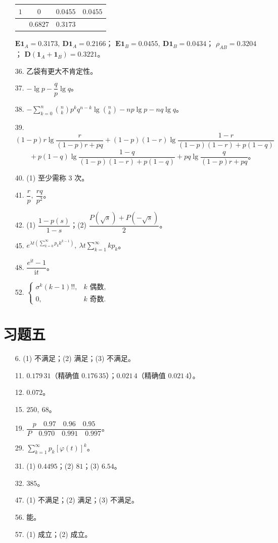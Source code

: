 \documentclass[../main.tex]{subfiles}
\begin{document}
\begin{enumerate}
\begin{center}
\begin{tabular}{c|cc|c}
$1$ & $0$ & $0.0455$ & $0.0455$\\
\hline
& $0.6827$ & $0.3173$ &
\end{tabular}\end{center}
$\boldsymbol{E}\mathbf{1}_A=0.3173,\ \boldsymbol{D}\mathbf{1}_A=0.2166$；
$\boldsymbol{E}\mathbf{1}_B=0.0455,\ \boldsymbol{D}\mathbf{1}_B=0.0434$；
$\rho_{AB}=0.3204$；
$\boldsymbol{D}(\mathbf{1}_A+\mathbf{1}_B)=0.3221$。
\item[36.] 乙袋有更大不肯定性。
\item[37.] $-\lg p-\dfrac{q}{p}\lg q$。
\item[38.] $-\displaystyle\sum_{k=0}^{n}\binom{n}{k}p^{k}q^{n-k}\lg\binom{n}{k}-np\lg p-nq\lg q$。
\item[39.] $(1-p)r\lg\dfrac{r}{(1-p)r+pq}+(1-p)(1-r)\lg\dfrac{1-r}{(1-p)(1-r)+p(1-q)}$\\
$\qquad+p(1-q)\lg\dfrac{1-q}{(1-p)(1-r)+p(1-q)}+pq\lg\dfrac{q}{(1-p)r+pq}$。
\item[40.] (1) 至少需称 $3$ 次。
\item[41.] $\dfrac{r}{p},\ \dfrac{rq}{p^{2}}$。
\item[42.] (1) $\dfrac{1-p(s)}{1-s}$；(2) $\dfrac{P(\sqrt{s})+P(-\sqrt{s})}{2}$。
\item[45.] $e^{\lambda t\left(\sum_{k=0}^{\infty}p_k k^{k-1}\right)},\ \lambda t\displaystyle\sum_{k=1}^{\infty}k p_k$。
\item[48.] $\dfrac{e^{\mathrm{i}t}-1}{\mathrm{i}t}$。
\item[52.] $\begin{cases}\sigma^{k}(k-1)!!, & k\text{ 偶数},\\ 0, & k\text{ 奇数}.\end{cases}$
\end{enumerate}

\section*{习题五}

\begin{enumerate}
\item[6.] (1) 不满足；(2) 满足；(3) 不满足。
\item[11.] $0.179\,31$（精确值 $0.176\,35$）；$0.021\,4$（精确值 $0.021\,4$）。
\item[12.] $0.072$。
\item[15.] $250,\ 68$。
\item[19.] $\dfrac{p\quad 0.97\quad 0.96\quad 0.95}{P\quad 0.970\quad 0.991\quad 0.997}$。
\item[29.] $\displaystyle\sum_{k=1}^{\infty}p_k[\varphi(t)]^{k}$。
\item[31.] (1) $0.4495$；(2) $81$；(3) $6.54$。
\item[32.] $385$。
\item[47.] (1) 不满足；(2) 满足；(3) 不满足。
\item[56.] 能。
\item[57.] (1) 成立；(2) 成立。
\end{enumerate}
\end{document}
